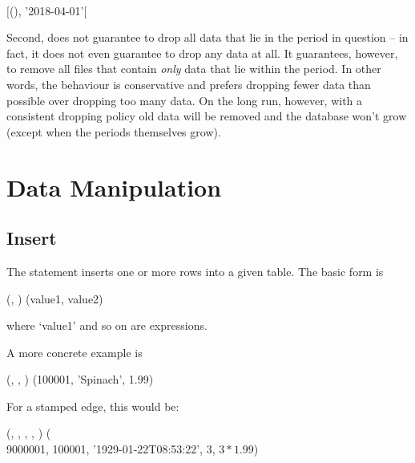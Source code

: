 \begin{minipage}{\textwidth}
  \\
$[$(), '2018-04-01'$[$
\end{minipage}

Second,  does not guarantee
to drop all data that lie in the period in question --
in fact, it does not even guarantee to drop any data at all.
It guarantees, however, to remove all files
that contain \emph{only} data that lie within the period.
In other words, the behaviour is conservative
and prefers dropping fewer data than possible over
dropping too many data.
On the long run, however, with a consistent dropping policy
old data will be removed and the database
won't grow (except when the periods themselves grow).

\section{Data Manipulation}
\subsection{Insert}
The  statement inserts one or more rows
into a given table.
The basic form is

  
                      (,
                       )
      (value1, value2)

where `value1' and so on are expressions.

A more concrete example is

  
                      (,
                       ,
                       )
      (100001, 'Spinach', 1.99)

For a stamped edge, this would be:

\begin{minipage}{\textwidth}
  
                      (,
                       ,
                       ,
                       ,
                       )
                      (\\
\hspace*{2.99cm}       9000001, 100001,
                       '1929-01-22T08:53:22',
                       3, $3\ast 1.99$)
\end{minipage}

